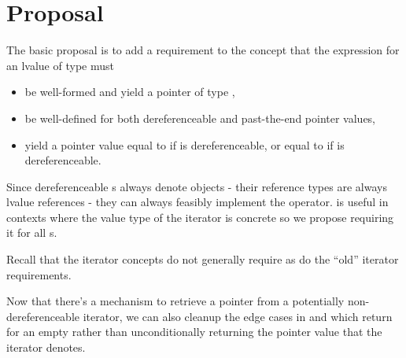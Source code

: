 \chapter{Proposal}

The basic proposal is to add a requirement to the
 concept that the expression
 for an lvalue  of type  must
\begin{itemize}
\item be well-formed and yield a pointer of type
  ,
\item be well-defined for both dereferenceable and past-the-end pointer values,
\item yield a pointer value equal to  if  is
  dereferenceable, or equal to  if 
  is dereferenceable.
\end{itemize}

Since dereferenceable s always denote objects -
their reference types are always lvalue references - they can always feasibly
implement the \tcode{->} operator. \tcode{->} is useful in contexts where the
value type of the iterator is concrete so we propose requiring it for all
s.
\begin{note}
Recall that the iterator concepts do not generally require 
as do the ``old'' iterator requirements.
\end{note}

Now that there's a mechanism to retrieve a pointer from a potentially
non-dereferenceable iterator, we can also cleanup the edge cases in
 and  which return
 for an empty  rather than unconditionally
returning the pointer value that the  iterator denotes.


